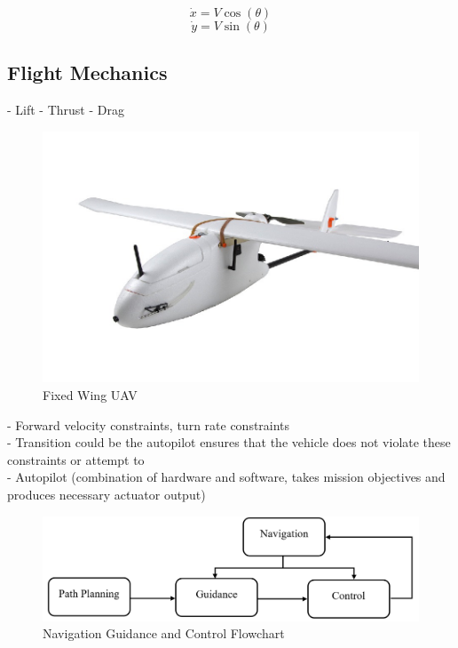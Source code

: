 \documentclass[numbered,pdftex]{ohio-etd}
\begin{document}
 \begin{equation}\label{dubinsx}
 \dot{x} = V\cos(\theta)
 \end{equation}
  \begin{equation}\label{dubinsy}
 \dot{y} = V\sin(\theta)
 \end{equation}
 


\subsection{Flight Mechanics}

- Lift
- Thrust
- Drag

\begin{figure}[h]
	\centering
	\includegraphics[width=0.7\linewidth]{PaperFigures/fixedwing}
	\caption{Fixed Wing UAV}
	\label{fig:fixedwing}
\end{figure}



- Forward velocity constraints, turn rate constraints \\
- Transition could be the autopilot ensures that the vehicle does not violate these constraints or attempt to \\
- Autopilot (combination of hardware and software, takes mission objectives and produces necessary actuator output)

%



\begin{figure}[h]
	\centering
	\includegraphics[width=0.7\linewidth]{PaperFigures/ngcFlow}
	\caption{Navigation Guidance and Control Flowchart}
	\label{fig:ngcflow}
\end{figure}
\end{document}
